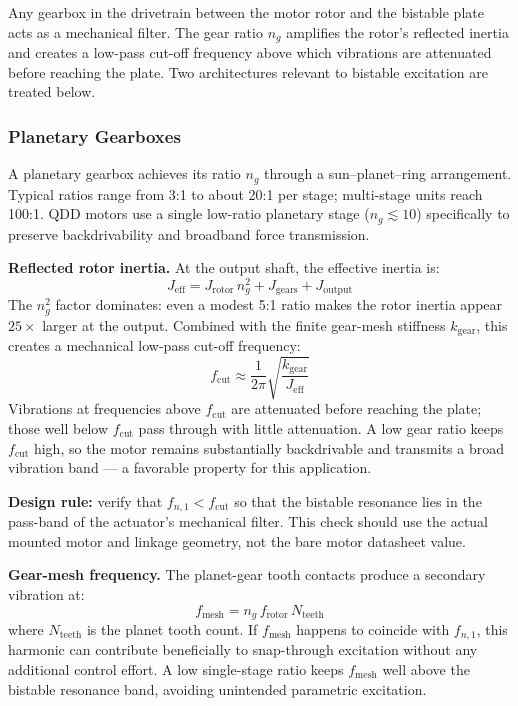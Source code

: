 \documentclass[11pt,letterpaper]{article}
\begin{document}
Any gearbox in the drivetrain between the motor rotor and the bistable plate
acts as a mechanical filter.  The gear ratio $n_g$ amplifies the rotor's
reflected inertia and creates a low-pass cut-off frequency above which
vibrations are attenuated before reaching the plate.  Two architectures
relevant to bistable excitation are treated below.

\subsubsection{Planetary Gearboxes}
\label{sssec:planetary}

A planetary gearbox achieves its ratio $n_g$ through a sun--planet--ring
arrangement.  Typical ratios range from 3:1 to about 20:1 per stage; multi-stage
units reach 100:1.  QDD motors use a single low-ratio planetary stage
($n_g \lesssim 10$) specifically to preserve backdrivability and broadband force
transmission.

\textbf{Reflected rotor inertia.}  At the output shaft, the effective inertia is:
\begin{equation}
  J_{\mathrm{eff}} = J_{\mathrm{rotor}}\,n_g^2 + J_{\mathrm{gears}} + J_{\mathrm{output}}
  \label{eq:Jeff}
\end{equation}
The $n_g^2$ factor dominates: even a modest 5:1 ratio makes the rotor inertia
appear $25\times$ larger at the output.  Combined with the finite gear-mesh
stiffness $k_{\mathrm{gear}}$, this creates a mechanical low-pass cut-off
frequency:
\begin{equation}
  f_{\mathrm{cut}} \approx \frac{1}{2\pi}\sqrt{\frac{k_{\mathrm{gear}}}{J_{\mathrm{eff}}}}
  \label{eq:fcut}
\end{equation}
Vibrations at frequencies above $f_{\mathrm{cut}}$ are attenuated before
reaching the plate; those well below $f_{\mathrm{cut}}$ pass through with
little attenuation.  A low gear ratio keeps $f_{\mathrm{cut}}$ high, so the
motor remains substantially backdrivable and transmits a broad vibration
band --- a favorable property for this application.

\textbf{Design rule:} verify that $f_{n,1} < f_{\mathrm{cut}}$ so that the
bistable resonance lies in the pass-band of the actuator's mechanical filter.
This check should use the actual mounted motor and linkage geometry, not the
bare motor datasheet value.

\textbf{Gear-mesh frequency.}  The planet-gear tooth contacts produce a
secondary vibration at:
\begin{equation}
  f_{\mathrm{mesh}} = n_g\,f_{\mathrm{rotor}}\,N_{\mathrm{teeth}}
  \label{eq:fmesh}
\end{equation}
where $N_{\mathrm{teeth}}$ is the planet tooth count.  If $f_{\mathrm{mesh}}$
happens to coincide with $f_{n,1}$, this harmonic can contribute beneficially to
snap-through excitation without any additional control effort.  A low single-stage
ratio keeps $f_{\mathrm{mesh}}$ well above the bistable resonance band, avoiding
unintended parametric excitation.
\end{document}
